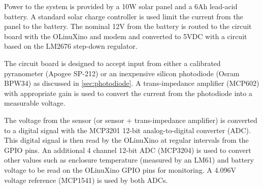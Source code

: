 Power to the system is provided by a 10W solar panel and a 6Ah
lead-acid battery.
A standard solar charge controller is used limit the current from the
panel to the battery.
The nominal 12V from the battery is routed to the circuit board with
the OLinuXino and modem and converted to 5VDC with a circuit based on
the LM2676 step-down regulator.

The circuit board is designed to accept input from either a calibrated
pyranometer (Apogee SP-212) or an inexpensive silicon photodiode
(Osram BPW34) as discussed in \cref{sec:photodiode}.
A trans-impedance amplifier (MCP602) with appropriate gain is used to
convert the current from the photodiode into a measurable voltage.

The voltage from the sensor (or sensor + trans-impedance amplifier) is
converted to a digital signal with the MCP3201 12-bit
analog-to-digital converter (ADC).
This digital signal is then read by the OLinuXino at regular intervals
from the GPIO pins.
An additional 4 channel 12-bit ADC (MCP3204) is used to convert other
values such as enclosure temperature (measured by an LM61) and battery
voltage to be read on the OLinuXino GPIO pins for monitoring.
A 4.096V voltage reference (MCP1541) is used by both ADCs.

